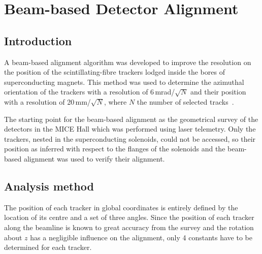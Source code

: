 \graphicspath{{09-Detector-alignment/Figures/}}

\section{Beam-based Detector Alignment}
\label{Sect:DA}

\subsection{Introduction}
\label{SubSect:DA_Intro}

A beam-based alignment algorithm was developed to improve the resolution on the position of the scintillating-fibre trackers lodged inside the bores of superconducting magnets. This method was used to determine the azimuthal orientation of the trackers with a resolution of 6\,mrad/$\sqrt{N}$ and their position with a resolution of 20\,mm/$\sqrt{N}$, where $N$ the number of selected tracks~\cite{2018arXiv1805.06623T}.


The starting point for the beam-based alignment as the geometrical survey of the detectors in the MICE Hall which was performed using laser telemetry.
Only the trackers, nested in the superconducting solenoids, could not be accessed, so their position as inferred with respect to the flanges of the solenoids and the beam-based alignment was used to verify their alignment.

\subsection{Analysis method}
\label{SubSect:DA_Analysis}

The position of each tracker in global coordinates is entirely defined by the location of its centre and a set of three angles.
Since the position of each tracker along the beamline is known to great accuracy from the survey and the rotation about $z$ has a negligible influence on the alignment, only 4 constants have to be determined for each tracker.


